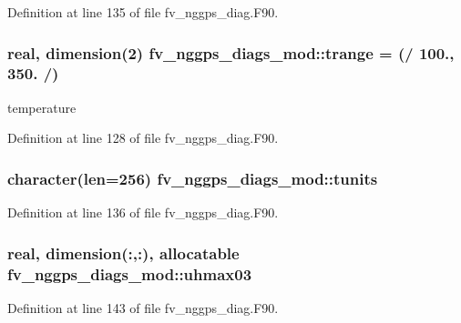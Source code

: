 Definition at line 135 of file fv\-\_\-nggps\-\_\-diag.\-F90.

\subsubsection[{trange}]{\setlength{\rightskip}{0pt plus 5cm}real, dimension(2) fv\-\_\-nggps\-\_\-diags\-\_\-mod\-::trange = (/ 100., 350. /)\hspace{0.3cm}{\ttfamily [private]}}\label{classfv__nggps__diags__mod_a63ac798b7bdc14c9cad4830deef4241d}


temperature 



Definition at line 128 of file fv\-\_\-nggps\-\_\-diag.\-F90.

\subsubsection[{tunits}]{\setlength{\rightskip}{0pt plus 5cm}character(len=256) fv\-\_\-nggps\-\_\-diags\-\_\-mod\-::tunits\hspace{0.3cm}{\ttfamily [private]}}\label{classfv__nggps__diags__mod_acf58902ead32fad28330b73b5aa61955}


Definition at line 136 of file fv\-\_\-nggps\-\_\-diag.\-F90.

\subsubsection[{uhmax03}]{\setlength{\rightskip}{0pt plus 5cm}real, dimension(\-:,\-:), allocatable fv\-\_\-nggps\-\_\-diags\-\_\-mod\-::uhmax03\hspace{0.3cm}{\ttfamily [private]}}\label{classfv__nggps__diags__mod_a672498c2dd7e91c63c8a14544b89313e}


Definition at line 143 of file fv\-\_\-nggps\-\_\-diag.\-F90.

